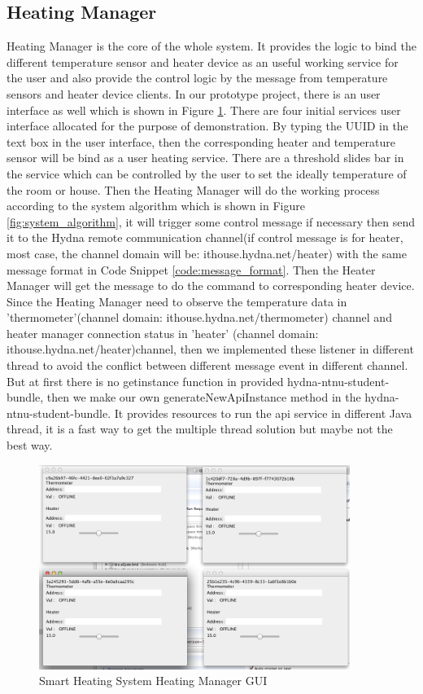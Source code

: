 \subsection{Heating Manager}
\par Heating Manager is the core of the whole system. It provides the logic to bind the different temperature sensor and heater device as an useful working service for the user and also provide the control logic by the message from temperature sensors and heater device clients. In our prototype project, there is an user interface as well which is shown in Figure \ref{fig:heating_manager}. There are four initial services user interface allocated for the purpose of demonstration. By typing the UUID in the text box in the user interface, then the corresponding heater and temperature sensor will be bind as a user heating service. There are a threshold slides bar in the service which can be controlled by the user to set the ideally temperature of the room or house. Then the Heating Manager will do the working process according to the system algorithm which is shown in Figure \ref{fig:system_algorithm}, it will trigger some control message if necessary then send it to the Hydna remote communication channel(if control message is for heater, most case, the channel domain will be: ithouse.hydna.net/heater) with the same message format in Code Snippet \ref{code:message_format}. Then the Heater Manager will get the message to do the command to corresponding heater device. Since the Heating Manager need to observe the temperature data in 'thermometer'(channel domain: ithouse.hydna.net/thermometer) channel and heater manager connection status in 'heater' (channel domain: ithouse.hydna.net/heater)channel, then we implemented these listener in different thread to avoid the conflict between different message event in different channel. But at first there is no getinstance function in provided hydna-ntnu-student-bundle\cite{hydna_ntnu_student_bundle}, then we make our own generateNewApiInstance method in the hydna-ntnu-student-bundle. It provides resources to run the api service in different Java thread, it is a fast way to get the multiple thread solution but maybe not the best way.

\begin{figure}
	\centering    	
\includegraphics[width=0.90\textwidth,natwidth=610,natheight=642]{figs/heating_manager.png}
  	\caption{Smart Heating System Heating Manager GUI}
  	\label{fig:heating_manager}
\end{figure}

